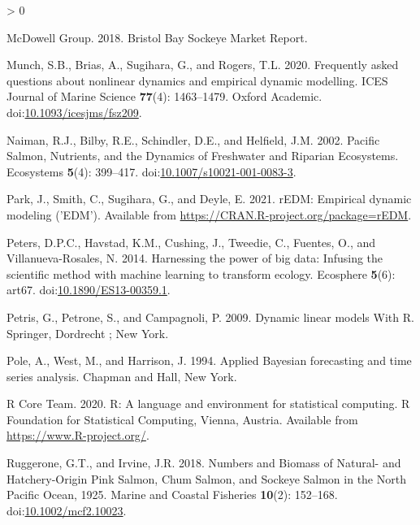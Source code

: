\documentclass[
]{article}
\newlength{\cslhangindent}
\newenvironment{CSLReferences}[2] %
 {%
  \setlength{\parindent}{0pt}
  \ifodd #1 \everypar{\setlength{\hangindent}{\cslhangindent}}\ignorespaces\fi
  \ifnum #2 > 0
  \setlength{\parskip}{#2\baselineskip}
  \fi
 }%
 {}
\begin{document}
\begin{CSLReferences}{1}{0}
\leavevmode\hypertarget{ref-mcdowellgroup2018}{}%
McDowell Group. 2018. Bristol {Bay Sockeye Market Report}.

\leavevmode\hypertarget{ref-munch2020}{}%
Munch, S.B., Brias, A., Sugihara, G., and Rogers, T.L. 2020. Frequently asked questions about nonlinear dynamics and empirical dynamic modelling. ICES Journal of Marine Science \textbf{77}(4): 1463--1479. {Oxford Academic}. doi:\href{https://doi.org/10.1093/icesjms/fsz209}{10.1093/icesjms/fsz209}.

\leavevmode\hypertarget{ref-naiman2002}{}%
Naiman, R.J., Bilby, R.E., Schindler, D.E., and Helfield, J.M. 2002. Pacific {Salmon}, {Nutrients}, and the {Dynamics} of {Freshwater} and {Riparian Ecosystems}. Ecosystems \textbf{5}(4): 399--417. doi:\href{https://doi.org/10.1007/s10021-001-0083-3}{10.1007/s10021-001-0083-3}.

\leavevmode\hypertarget{ref-park2020}{}%
Park, J., Smith, C., Sugihara, G., and Deyle, E. 2021. rEDM: Empirical dynamic modeling ('EDM'). Available from \url{https://CRAN.R-project.org/package=rEDM}.

\leavevmode\hypertarget{ref-peters2014}{}%
Peters, D.P.C., Havstad, K.M., Cushing, J., Tweedie, C., Fuentes, O., and Villanueva-Rosales, N. 2014. Harnessing the power of big data: Infusing the scientific method with machine learning to transform ecology. Ecosphere \textbf{5}(6): art67. doi:\href{https://doi.org/10.1890/ES13-00359.1}{10.1890/ES13-00359.1}.

\leavevmode\hypertarget{ref-petris2009}{}%
Petris, G., Petrone, S., and Campagnoli, P. 2009. Dynamic linear models {With R}. {Springer}, {Dordrecht ; New York}.

\leavevmode\hypertarget{ref-pole1994}{}%
Pole, A., West, M., and Harrison, J. 1994. Applied {Bayesian} forecasting and time series analysis. {Chapman and Hall}, {New York}.

\leavevmode\hypertarget{ref-rcoreteam2020}{}%
R Core Team. 2020. R: A language and environment for statistical computing. R Foundation for Statistical Computing, Vienna, Austria. Available from \url{https://www.R-project.org/}.

\leavevmode\hypertarget{ref-ruggerone2018}{}%
Ruggerone, G.T., and Irvine, J.R. 2018. Numbers and {Biomass} of {Natural}- and {Hatchery}-{Origin Pink Salmon}, {Chum Salmon}, and {Sockeye Salmon} in the {North Pacific Ocean}, 1925{}. Marine and Coastal Fisheries \textbf{10}(2): 152--168. doi:\href{https://doi.org/10.1002/mcf2.10023}{10.1002/mcf2.10023}.


\end{CSLReferences}
\end{document}
